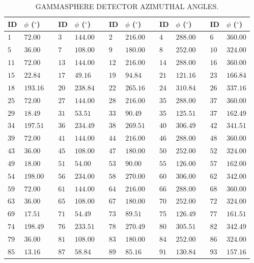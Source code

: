 \begin{table}
\caption{GAMMASPHERE DETECTOR AZIMUTHAL ANGLES.\label{tbl:app1-gs-detectors}}
\begin{center}
\begin{tabular}{llcllcllcllcll}
\toprule
ID & $\phi$ ($^{\circ}$) & & ID & $\phi$ ($^{\circ}$) & & ID & $\phi$ ($^{\circ}$) & & ID & $\phi$ ($^{\circ}$) & & ID & $\phi$ ($^{\circ}$)\\
\midrule
  $1$& $72.00$& &  $3$&$144.00$& &  $2$&$216.00$& &  $4$&$288.00$& &  $6$&$360.00$\\
  $5$& $36.00$& &  $7$&$108.00$& &  $9$&$180.00$& &  $8$&$252.00$& & $10$&$324.00$\\
 $11$& $72.00$& & $13$&$144.00$& & $12$&$216.00$& & $14$&$288.00$& & $16$&$360.00$\\
 $15$& $22.84$& & $17$& $49.16$& & $19$& $94.84$& & $21$&$121.16$& & $23$&$166.84$\\
 $18$&$193.16$& & $20$&$238.84$& & $22$&$265.16$& & $24$&$310.84$& & $26$&$337.16$\\
 $25$& $72.00$& & $27$&$144.00$& & $28$&$216.00$& & $35$&$288.00$& & $37$&$360.00$\\ 
 $29$& $18.49$& & $31$& $53.51$& & $33$& $90.49$& & $35$&$125.51$& & $37$&$162.49$\\
 $34$&$197.51$& & $36$&$234.49$& & $38$&$269.51$& & $40$&$306.49$& & $42$&$341.51$\\
 $39$& $72.00$& & $41$&$144.00$& & $44$&$216.00$& & $46$&$288.00$& & $48$&$360.00$\\ 
 $43$& $36.00$& & $45$&$108.00$& & $47$&$180.00$& & $50$&$252.00$& & $52$&$324.00$\\ 
 $49$& $18.00$& & $51$& $54.00$& & $53$& $90.00$& & $55$&$126.00$& & $57$&$162.00$\\
 $54$&$198.00$& & $56$&$234.00$& & $58$&$270.00$& & $60$&$306.00$& & $62$&$342.00$\\
 $59$& $72.00$& & $61$&$144.00$& & $64$&$216.00$& & $66$&$288.00$& & $68$&$360.00$\\
 $63$& $36.00$& & $65$&$108.00$& & $67$&$180.00$& & $70$&$252.00$& & $72$&$324.00$\\
 $69$& $17.51$& & $71$& $54.49$& & $73$& $89.51$& & $75$&$126.49$& & $77$&$161.51$\\
 $74$&$198.49$& & $76$&$233.51$& & $78$&$270.49$& & $80$&$305.51$& & $82$&$342.49$\\
 $79$& $36.00$& & $81$&$108.00$& & $83$&$180.00$& & $84$&$252.00$& & $86$&$324.00$\\
 $85$& $13.16$& & $87$& $58.84$& & $89$& $85.16$& & $91$&$130.84$& & $93$&$157.16$\\

\end{tabular}
\end{center}
\end{table}
